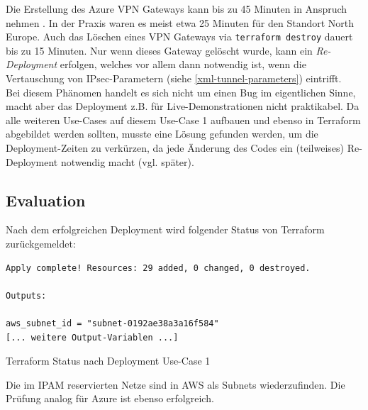 Die Erstellung des Azure VPN Gateways kann bis zu 45 Minuten in Anspruch nehmen \cite{azurevpndeployment2021}. In der Praxis waren es meist etwa 25 Minuten für den Standort \glqq North Europe\grqq{}. Auch das Löschen eines VPN Gateways via \texttt{terraform destroy} dauert bis zu 15 Minuten. Nur wenn dieses Gateway gelöscht wurde, kann ein \textit{Re-Deployment} erfolgen, welches vor allem dann notwendig ist, wenn die Vertauschung von IPsec-Parametern (siehe \ref{xml-tunnel-parameters}) eintrifft.\\
Bei diesem Phänomen handelt es sich nicht um einen Bug im eigentlichen Sinne, macht aber das Deployment z.B. für Live-Demonstrationen nicht praktikabel. Da alle weiteren Use-Cases auf diesem Use-Case 1 aufbauen und ebenso in Terraform abgebildet werden sollten, musste eine Lösung gefunden werden, um die Deployment-Zeiten zu verkürzen, da jede Änderung des Codes ein (teilweises) Re-Deployment notwendig macht (vgl. später).

\subsection{Evaluation}
Nach dem erfolgreichen Deployment wird folgender Status von Terraform zurückgemeldet:
\begin{listing}[h]
\begin{verbatim}
Apply complete! Resources: 29 added, 0 changed, 0 destroyed.

Outputs:

aws_subnet_id = "subnet-0192ae38a3a16f584"
[... weitere Output-Variablen ...]
\end{verbatim}
\caption{Terraform Status nach Deployment Use-Case 1}
\label{tf-base-deployment-ok}
\end{listing}
Die im IPAM reservierten Netze sind in AWS als Subnets wiederzufinden. Die Prüfung analog für Azure ist ebenso erfolgreich.

